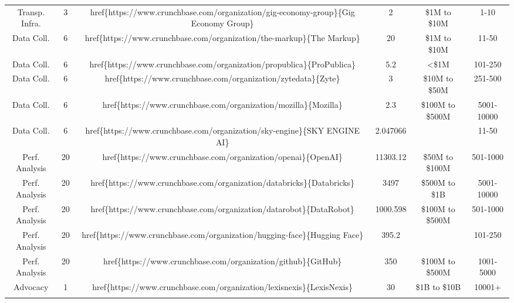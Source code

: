 \begin{table}[!htbp]
\begin{tabular}{@{\extracolsep{5pt}} cccccc}
Transp. Infra. & 3 & href\{https://www.crunchbase.com/organization/gig-economy-group\}\{Gig Economy Group\} & 2 & \$1M to \$10M & 1-10 \\ 
Data Coll. & 6 & href\{https://www.crunchbase.com/organization/the-markup\}\{The Markup\} & 20 & \$1M to \$10M & 11-50 \\ 
Data Coll. & 6 & href\{https://www.crunchbase.com/organization/propublica\}\{ProPublica\} & 5.2 & \textless \$1M & 101-250 \\ 
Data Coll. & 6 & href\{https://www.crunchbase.com/organization/zytedata\}\{Zyte\} & 3 & \$10M to \$50M & 251-500 \\ 
Data Coll. & 6 & href\{https://www.crunchbase.com/organization/mozilla\}\{Mozilla\} & 2.3 & \$100M to \$500M & 5001-10000 \\ 
Data Coll. & 6 & href\{https://www.crunchbase.com/organization/sky-engine\}\{SKY ENGINE AI\} & 2.047066 &  & 11-50 \\ 
Perf. Analysis & 20 & href\{https://www.crunchbase.com/organization/openai\}\{OpenAI\} & 11303.12 & \$50M to \$100M & 501-1000 \\ 
Perf. Analysis & 20 & href\{https://www.crunchbase.com/organization/databricks\}\{Databricks\} & 3497 & \$500M to \$1B & 5001-10000 \\ 
Perf. Analysis & 20 & href\{https://www.crunchbase.com/organization/datarobot\}\{DataRobot\} & 1000.598 & \$100M to \$500M & 501-1000 \\ 
Perf. Analysis & 20 & href\{https://www.crunchbase.com/organization/hugging-face\}\{Hugging Face\} & 395.2 &  & 101-250 \\ 
Perf. Analysis & 20 & href\{https://www.crunchbase.com/organization/github\}\{GitHub\} & 350 & \$100M to \$500M & 1001-5000 \\ 
Advocacy & 1 & href\{https://www.crunchbase.com/organization/lexisnexis\}\{LexisNexis\} & 30 & \$1B to \$10B & 10001+ \\ 
\hline \\[-1.8ex] 
\end{tabular} 
\end{table} 
